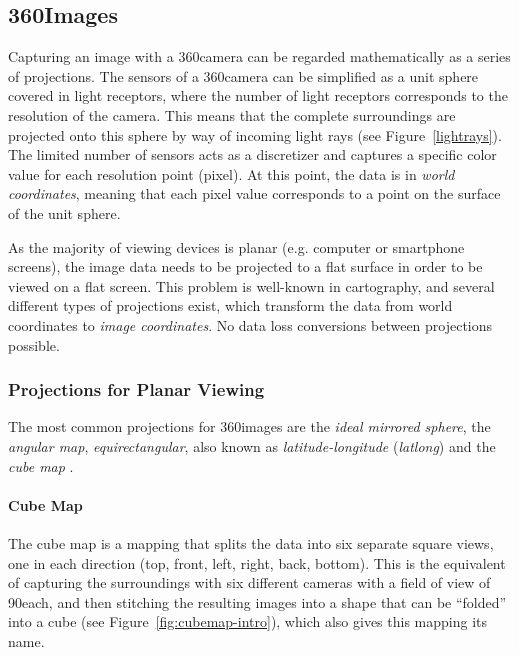 \subsection{360\degree Images}\label{fundamentals_360}
Capturing an image with a 360\degree camera can be regarded mathematically as a series of projections. The sensors of a 360\degree camera can be simplified as a unit sphere covered in light receptors, where the number of light receptors corresponds to the resolution of the camera. This means that the complete surroundings are projected onto this sphere by way of incoming light rays (see Figure~\ref{lightrays}). The limited number of sensors acts as a discretizer and captures a specific color value for each resolution point (pixel). At this point, the data is in \emph{world coordinates}, meaning that each pixel value corresponds to a point on the surface of the unit sphere. 

As the majority of viewing devices is planar (e.g. computer or smartphone screens), the image data needs to be projected to a flat surface in order to be viewed on a flat screen. This problem is well-known in cartography, and several different types of projections exist, which transform the data from world coordinates to \emph{image coordinates}. No data loss \ar conversions between projections possible.

\subsubsection{Projections for Planar Viewing \label{projections} \cite{hdrbook}}
The most common projections for 360\degree images are the \emph{ideal mirrored sphere}, the \emph{angular map},  \emph{equirectangular}, also known as \emph{latitude-longitude} (\emph{latlong}) and the \emph{cube map} \cite{hdrbook}.

\paragraph{Cube Map}
The cube map is a mapping that splits the data into six separate square views, one in each direction (top, front, left, right, back, bottom). This is the equivalent of capturing the surroundings with six different cameras with a field of view of 90\degree each, and then stitching the resulting images into a shape that can be ``folded'' into a cube (see Figure~\ref{fig:cubemap-intro}), which also gives this mapping its name.

